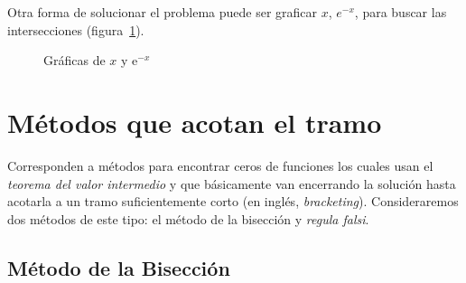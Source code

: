   Otra forma de solucionar el problema
  puede ser graficar \(x\), \(e^{-x}\),
  para buscar las intersecciones
  (figura~\ref{fig:plot-intersect}).
  \begin{figure}[ht]
    \centering
    \caption{Gráficas de \(x\) y \(\mathrm{e}^{-x}\)}
    \label{fig:plot-intersect}
  \end{figure}

\section{Métodos que acotan el tramo}

  Corresponden a métodos para encontrar ceros de funciones
  los cuales usan el \emph{teorema del valor intermedio}
  y que básicamente van encerrando la solución
  hasta acotarla a un tramo suficientemente corto
  (en inglés, \emph{\foreignlanguage{english}{bracketing}}).
  Consideraremos dos métodos de este tipo:
  el método de la bisección y \foreignlanguage{latin}{\emph{regula falsi}}.

\subsection{Método de la Bisección}

